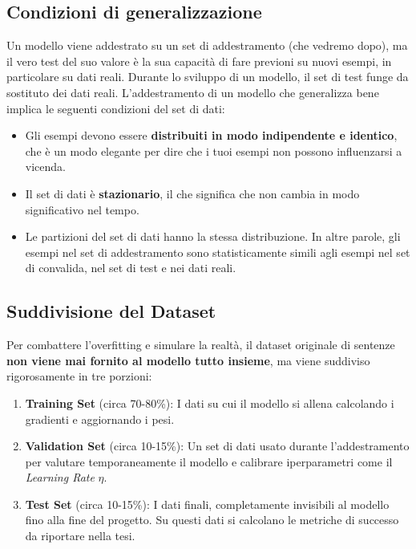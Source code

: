 \documentclass{article}
\begin{document}
\subsection{Condizioni di generalizzazione}
Un modello viene addestrato su un set di addestramento (che vedremo dopo), ma il vero test del suo valore è la sua capacità di fare previoni su nuovi esempi, in particolare su dati reali. Durante lo sviluppo di un modello, il set di test funge da sostituto dei dati reali. L'addestramento di un modello che generalizza bene implica le seguenti condizioni del set di dati:
\\
\begin{itemize}
    \item Gli esempi devono essere \textbf{distribuiti in modo indipendente e identico}, che è un modo elegante per dire che i tuoi esempi non possono influenzarsi a vicenda.

    \item Il set di dati è \textbf{stazionario}, il che significa che non cambia in modo significativo nel tempo.

    \item Le partizioni del set di dati hanno la stessa distribuzione. In altre parole, gli esempi nel set di addestramento sono statisticamente simili agli esempi nel set di convalida, nel set di test e nei dati reali.
\end{itemize}



\subsection{Suddivisione del Dataset}
Per combattere l'overfitting e simulare la realtà, il dataset originale di sentenze \textbf{non viene mai fornito al modello tutto insieme}, ma viene suddiviso rigorosamente in tre porzioni:\\
\begin{enumerate}
    \item \textbf{Training Set} (circa 70-80\%): I dati su cui il modello si allena calcolando i gradienti e aggiornando i pesi.

    \item \textbf{Validation Set} (circa 10-15\%): Un set di dati usato durante l'addestramento per valutare temporaneamente il modello e calibrare iperparametri come il \textit{Learning Rate} $\eta$.

    \item \textbf{Test Set} (circa 10-15\%): I dati finali, completamente invisibili al modello fino alla fine del progetto. Su questi dati si calcolano le metriche di successo da riportare nella tesi.
\end{enumerate}
\end{document}
